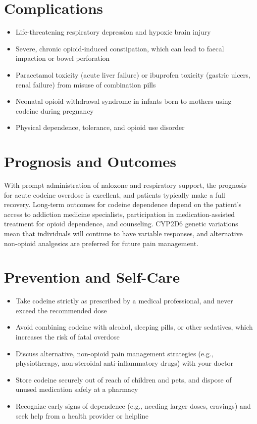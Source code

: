 \section*{Complications}
\begin{itemize}
    \item Life-threatening respiratory depression and hypoxic brain injury
    \item Severe, chronic opioid-induced constipation, which can lead to faecal impaction or bowel perforation
    \item Paracetamol toxicity (acute liver failure) or ibuprofen toxicity (gastric ulcers, renal failure) from misuse of combination pills
    \item Neonatal opioid withdrawal syndrome in infants born to mothers using codeine during pregnancy
    \item Physical dependence, tolerance, and opioid use disorder
\end{itemize}

\section*{Prognosis and Outcomes}
With prompt administration of naloxone and respiratory support, the prognosis for acute codeine overdose is excellent, and patients typically make a full recovery. Long-term outcomes for codeine dependence depend on the patient's access to addiction medicine specialists, participation in medication-assisted treatment for opioid dependence, and counseling. CYP2D6 genetic variations mean that individuals will continue to have variable responses, and alternative non-opioid analgesics are preferred for future pain management.

\section*{Prevention and Self-Care}
\begin{itemize}
    \item Take codeine strictly as prescribed by a medical professional, and never exceed the recommended dose
    \item Avoid combining codeine with alcohol, sleeping pills, or other sedatives, which increases the risk of fatal overdose
    \item Discuss alternative, non-opioid pain management strategies (e.g., physiotherapy, non-steroidal anti-inflammatory drugs) with your doctor
    \item Store codeine securely out of reach of children and pets, and dispose of unused medication safely at a pharmacy
    \item Recognize early signs of dependence (e.g., needing larger doses, cravings) and seek help from a health provider or helpline
\end{itemize}

